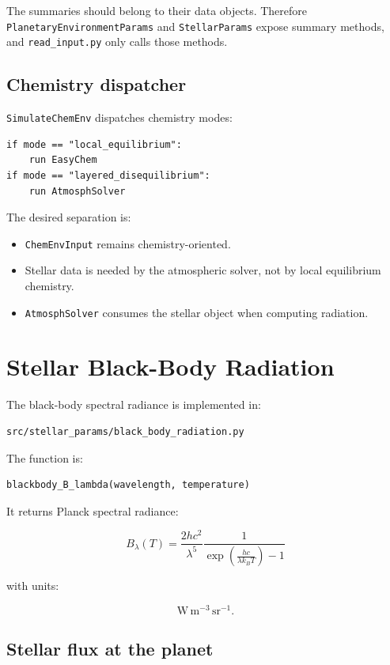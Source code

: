\documentclass[11pt]{article}
\begin{document}
The summaries should belong to their data objects. Therefore
\texttt{PlanetaryEnvironmentParams} and \texttt{StellarParams} expose summary
methods, and \texttt{read\_input.py} only calls those methods.

\subsection{Chemistry dispatcher}

\texttt{SimulateChemEnv} dispatches chemistry modes:

\begin{lstlisting}
if mode == "local_equilibrium":
    run EasyChem
if mode == "layered_disequilibrium":
    run AtmosphSolver
\end{lstlisting}

The desired separation is:

\begin{itemize}
  \item \texttt{ChemEnvInput} remains chemistry-oriented.
  \item Stellar data is needed by the atmospheric solver, not by local
        equilibrium chemistry.
  \item \texttt{AtmosphSolver} consumes the stellar object when computing
        radiation.
\end{itemize}

\section{Stellar Black-Body Radiation}

The black-body spectral radiance is implemented in:

\begin{lstlisting}
src/stellar_params/black_body_radiation.py
\end{lstlisting}

The function is:

\begin{lstlisting}
blackbody_B_lambda(wavelength, temperature)
\end{lstlisting}

It returns Planck spectral radiance:

\[
B_{\lambda}(T) =
\frac{2hc^2}{\lambda^5}
\frac{1}{\exp\left(\frac{hc}{\lambda k_B T}\right)-1}
\]

with units:

\[
\mathrm{W \, m^{-3} \, sr^{-1}}.
\]

\subsection{Stellar flux at the planet}
\end{document}
